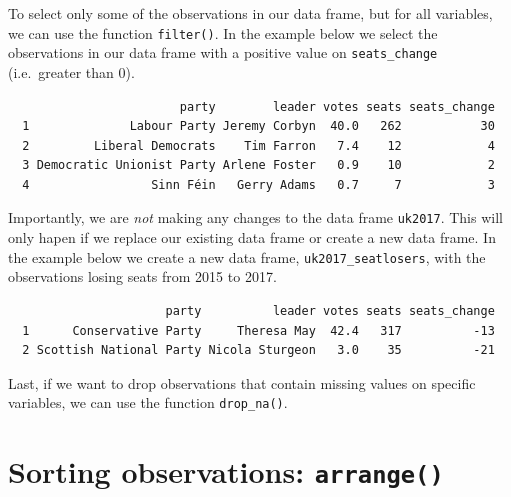 \documentclass[12pt,oneside]{reedthesis}
\theoremstyle{definition}
\theoremstyle{definition}
\theoremstyle{definition}
\theoremstyle{remark}
\begin{document}
  To select only some of the observations in our data frame, but for all
  variables, we can use the function \texttt{filter()}. In the example
  below we select the observations in our data frame with a positive value
  on \texttt{seats\_change} (i.e.~greater than 0).
  \begin{Shaded}
  \begin{Highlighting}[]
  \OperatorTok{>}\StringTok{ }\NormalTok{)}
  \end{Highlighting}
  \end{Shaded}
  \begin{verbatim}
                        party        leader votes seats seats_change
  1              Labour Party Jeremy Corbyn  40.0   262           30
  2         Liberal Democrats    Tim Farron   7.4    12            4
  3 Democratic Unionist Party Arlene Foster   0.9    10            2
  4                 Sinn Féin   Gerry Adams   0.7     7            3
  \end{verbatim}
  Importantly, we are \emph{not} making any changes to the data frame
  \texttt{uk2017}. This will only hapen if we replace our existing data
  frame or create a new data frame. In the example below we create a new
  data frame, \texttt{uk2017\_seatlosers}, with the observations losing
  seats from 2015 to 2017.
  \begin{Shaded}
  \begin{Highlighting}[]
  \StringTok{ }\OperatorTok{<}\StringTok{ }\NormalTok{)}
  \end{Highlighting}
  \end{Shaded}
  \begin{verbatim}
                      party          leader votes seats seats_change
  1      Conservative Party     Theresa May  42.4   317          -13
  2 Scottish National Party Nicola Sturgeon   3.0    35          -21
  \end{verbatim}
  Last, if we want to drop observations that contain missing values on
  specific variables, we can use the function \texttt{drop\_na()}.
  
  \section{\texorpdfstring{Sorting observations:
  \texttt{arrange()}}{Sorting observations: arrange()}}\label{sorting-observations-arrange}
  
\end{document}
